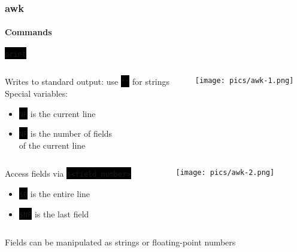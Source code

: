 \documentclass[unknownkeysallowed, 10pt, a4 paper, handout]{beamer}
\newcommand{\code}[1]{\colorbox{black}{\color{green}\texttt{#1}}}
\begin{document}
\begin{frame}
  \frametitle{awk}
  \framesubtitle{Commands}

  \begin{block}{\code{print}}
    \begin{columns}
      \begin{column}{0.69\textwidth}
        Writes to standard output: use \code{""} for strings \\
        Special variables:
        \begin{itemize}
          \item \code{NR} is the current line
          \item \code{NF} is the number of fields\\
          of the current line
        \end{itemize}
      \end{column}
      \begin{column}{0.31\textwidth}
        \texttt{[image: pics/awk-1.png]}
      \end{column}
    \end{columns}

    \begin{columns}
      \begin{column}{0.60\textwidth}
        Access fields via \code{\$<field\_number>}
        \begin{itemize}
          \item \code{\$0} is the entire line
          \item \code{\$NF} is the last field
        \end{itemize}
      \end{column}
      \begin{column}{0.40\textwidth}
        \texttt{[image: pics/awk-2.png]}
      \end{column}
    \end{columns}
  \end{block}
  \begin{alertblock}{}
    Fields can be manipulated as strings or floating-point numbers
  \end{alertblock}
\end{frame}
\end{document}
